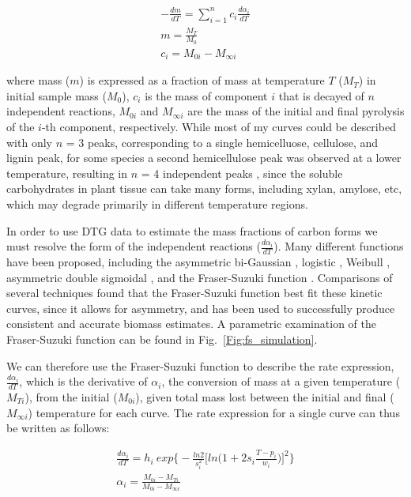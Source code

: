 \documentclass{article}
\begin{document}
\begin{gather}\label{eqn:mixture_model}
	-\frac{dm}{dT} = \sum\limits_{i=1}^n c_i\frac{d\alpha_{i}}{dT}\\
	m = \frac{M_T}{M_0}\\
	c_i = M_{0i} - M_{\infty i}
\end{gather}

where mass ($m$) is expressed as a fraction of mass at temperature $T$ ($M_T$) in initial sample mass ($M_0$), $c_i$ is the mass of component $i$ that is decayed of $n$ independent reactions, $M_{0i}$ and $M_{\infty i}$ are the mass of the initial and final pyrolysis of the $i$-th component, respectively. While most of my curves could be described with only $n$ = 3 peaks, corresponding to a single hemicelluose, cellulose, and lignin peak, for some species a second hemicellulose peak was observed at a lower temperature, resulting in $n$ = 4 independent peaks \citep[see also][]{chen2017,muller-hagedorn2007}, since the soluble carbohydrates in plant tissue can take many forms, including xylan, amylose, etc, which may degrade primarily in different temperature regions. 

In order to use DTG data to estimate the mass fractions of carbon forms we must resolve the form of the independent reactions ($\frac{d\alpha_{i}}{dT}$). Many different functions have been proposed, including the asymmetric bi-Gaussian \citep{sun2015}, logistic \citep{barbadillo2007}, Weibull \citep{cai2007}, asymmetric double sigmoidal \citep{chen2017}, and the Fraser-Suzuki function \citep{perejon2011,hu2016}. Comparisons of several techniques \citep{svoboda2013,perejon2011,cheng2015} found that the Fraser-Suzuki function best fit these kinetic curves, since it allows for asymmetry, and has been used to successfully produce consistent and accurate biomass estimates. A parametric examination of the Fraser-Suzuki function can be found in Fig.~\ref{Fig:fs_simulation}. 

We can therefore use the Fraser-Suzuki function to describe the rate expression, $\frac{d\alpha_{i}}{dT}$, which is the derivative of $\alpha_i$, the conversion of mass at a given temperature ($M_{Ti}$), from the initial ($M_{0i}$), given total mass lost between the initial and final ($M_{\infty i}$) temperature for each curve. The rate expression for a single curve can thus be written as follows:

\begin{gather}\label{eqn:fs_function}
	\frac{d\alpha_i}{dT} = h_i\ exp\bigg\{-\frac{ln2}{s_i^2}\Big[ln\Big(1 + 2s_i \frac{T - p_i}{w_i}\Big)\Big]^2\bigg\}\\
	\alpha_i = \frac{M_{0i} - M_{Ti}}{M_{0i} - M_{\infty i}}
\end{gather}
\end{document}

